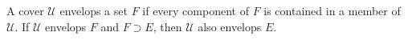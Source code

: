 A cover $\mathcal{U}$ envelops a set $F$ if every component of $F$ is contained in a member of $\mathcal{U}$. If $\mathcal{U}$ envelops $F$ and $F \supset E$, then $\mathcal{U}$ also envelops $E$.
